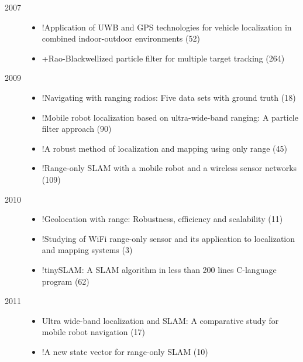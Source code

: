 \begin{description}
\item[2007]
\begin{itemize}
\item !Application of UWB and GPS technologies for vehicle localization in combined indoor-outdoor environments (52)
\item +Rao-Blackwellized particle filter for multiple target tracking (264)
\end{itemize}


\item[2009]
\begin{itemize}
\item !Navigating with ranging radios: Five data sets with ground truth (18)
\item !Mobile robot localization based on ultra-wide-band ranging: A particle filter approach (90)
\item !A robust method of localization and mapping using only range (45)
\item !Range-only SLAM with a mobile robot and a wireless sensor networks (109)
\end{itemize}

\item[2010]
\begin{itemize}
\item !Geolocation with range: Robustness, efficiency and scalability (11)
\item !Studying of WiFi range-only sensor and its application to localization and mapping systems (3)
\item !tinySLAM: A SLAM algorithm in less than 200 lines C-language program (62)
\end{itemize}

\item[2011]
\begin{itemize}
\item Ultra wide-band localization and SLAM: A comparative study for mobile robot navigation (17)
\item !A new state vector for range-only SLAM (10)
\end{itemize}


\end{description}
